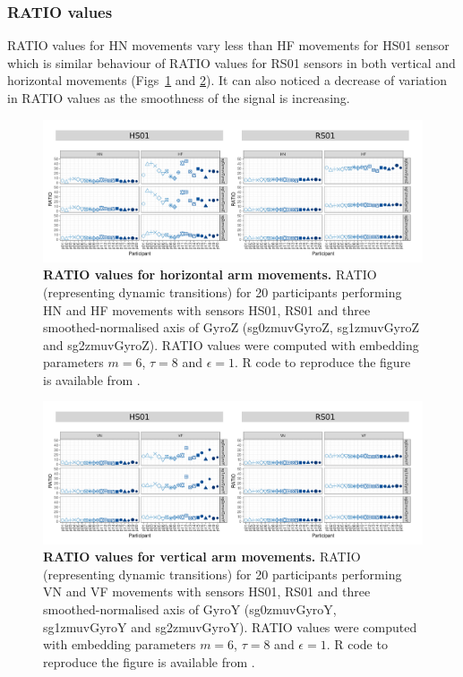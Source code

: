 






\subsubsection*{RATIO values}
RATIO values for HN movements vary less than HF movements for HS01 sensor 
which is similar behaviour of RATIO values for RS01 sensors 
in both vertical and horizontal movements (Figs~\ref{fig:ratio_aH} and \ref{fig:ratio_aV}).
It can also noticed a decrease of variation in RATIO values as the smoothness of the signal is increasing.
\begin{figure}[!h]
\centering
\includegraphics[width=1.0\textwidth]{ratio_aH}
    \caption{
	{\bf RATIO values for horizontal arm movements.}
	RATIO (representing dynamic transitions) for 
	20 participants performing HN and HF movements
	with sensors HS01, RS01 and three smoothed-normalised axis 
	of GyroZ (sg0zmuvGyroZ, sg1zmuvGyroZ and sg2zmuvGyroZ).
	RATIO values were computed with 
	embedding parameters $m=6$, $\tau=8$ and $\epsilon=1$.
	R code to reproduce the figure is available from \cite{hwum2018}.
        }
    \label{fig:ratio_aH}
\end{figure}
\begin{figure}[!h]
\centering
\includegraphics[width=1.0\textwidth]{ratio_aV}
    \caption{
	{\bf RATIO values for vertical arm movements.}
	RATIO (representing dynamic transitions) for 
	20 participants performing VN and VF movements
	with sensors HS01, RS01 and three smoothed-normalised axis 
	of GyroY (sg0zmuvGyroY, sg1zmuvGyroY and sg2zmuvGyroY).
	RATIO values were computed with
	embedding parameters $m=6$, $\tau=8$ and $\epsilon=1$.
	R code to reproduce the figure is available from \cite{hwum2018}.
        }
    \label{fig:ratio_aV}
\end{figure}
